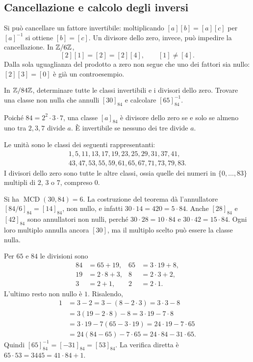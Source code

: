 \subsection{Cancellazione e calcolo degli inversi}
\begin{osservazione}
Si può cancellare un fattore invertibile: moltiplicando $[a][b]=[a][c]$ per $[a]^{-1}$ si ottiene $[b]=[c]$. Un divisore dello zero, invece, può impedire la cancellazione. In $\mathbb{Z}/6\mathbb{Z}$,
\[
[2][1]=[2]=[2][4],\qquad [1]\ne[4].
\]
Dalla sola uguaglianza del prodotto a zero non segue che uno dei fattori sia nullo: $[2][3]=[0]$ è già un controesempio.
\end{osservazione}

\begin{esercizio}
In $\mathbb{Z}/84\mathbb{Z}$, determinare tutte le classi invertibili e i divisori dello zero. Trovare una classe non nulla che annulli $[30]_{84}$ e calcolare $[65]_{84}^{-1}$.
\end{esercizio}
\begin{svolgimento}
Poiché $84=2^2\cdot3\cdot7$, una classe $[a]_{84}$ è divisore dello zero se e solo se almeno uno tra $2,3,7$ divide $a$. È invertibile se nessuno dei tre divide $a$.

Le unità sono le classi dei seguenti rappresentanti:
\[
\begin{gathered}
1,5,11,13,17,19,23,25,29,31,37,41,\\
43,47,53,55,59,61,65,67,71,73,79,83.
\end{gathered}
\]
I divisori dello zero sono tutte le altre classi, ossia quelle dei numeri in $\{0,\ldots,83\}$ multipli di $2$, $3$ o $7$, compreso $0$.

Si ha $\operatorname{MCD}(30,84)=6$. La costruzione del teorema dà l'annullatore $[84/6]_{84}=[14]_{84}$, non nullo, e infatti $30\cdot14=420=5\cdot84$. Anche $[28]_{84}$ e $[42]_{84}$ sono annullatori non nulli, perché $30\cdot28=10\cdot84$ e $30\cdot42=15\cdot84$. Ogni loro multiplo annulla ancora $[30]$, ma il multiplo scelto può essere la classe nulla.

Per $65$ e $84$ le divisioni sono
\[
\begin{aligned}
84&=65+19,&65&=3\cdot19+8,\\
19&=2\cdot8+3,&8&=2\cdot3+2,\\
3&=2+1,&2&=2\cdot1.
\end{aligned}
\]
L'ultimo resto non nullo è $1$. Risalendo,
\[
\begin{aligned}
1&=3-2=3-(8-2\cdot3)=3\cdot3-8\\
 &=3(19-2\cdot8)-8=3\cdot19-7\cdot8\\
 &=3\cdot19-7(65-3\cdot19)=24\cdot19-7\cdot65\\
 &=24(84-65)-7\cdot65=24\cdot84-31\cdot65.
\end{aligned}
\]
Quindi $[65]_{84}^{-1}=[-31]_{84}=[53]_{84}$. La verifica diretta è $65\cdot53=3445=41\cdot84+1$.
\end{svolgimento}

